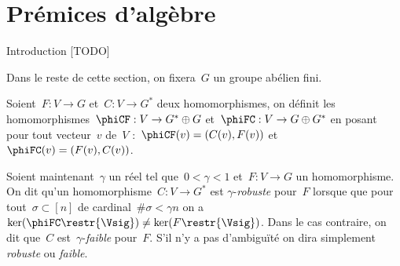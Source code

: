 \section{Prémices d'algèbre}
	Introduction [TODO]
	
	Dans le reste de cette section, on fixera~$G$  un groupe abélien fini.
	
	Soient~$F: V \rightarrow G$ et~$C : V \rightarrow G^*$ deux homomorphismes, on définit les homomorphismes~$\phiCF : V \rightarrow G^* \oplus G$ et~$\phiFC : V \rightarrow G \oplus G^*$ en posant pour tout vecteur~$v$ de~$V$ :~$\phiCF(v) = (C(v),F(v))$ et~$\phiFC(v) = (F(v),C(v))$\marginnote{$\phiCF, \phiFC$}.
	
	Soient maintenant~$\gamma$ un réel tel que~$0<\gamma<1$ et~$F : V \rightarrow G$ un homomorphisme. On dit qu'un homomorphisme~$C : V \rightarrow G^*$ est $\gamma$-\emph{robuste} pour~$F$ lorsque que pour tout~$\sigma \subset [n]$ de cardinal~$\#\sigma < \gamma n$ on a~$\ker(\phiFC\restr{\Vsig}) \neq \ker(F\restr{\Vsig})$. Dans le cas contraire, on dit que~$C$ est~$\gamma$-\emph{faible} pour~$F$. S'il n'y a pas d'ambiguïté on dira simplement \emph{robuste} ou \emph{faible}.
	

